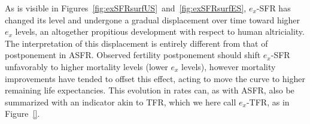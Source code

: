 As is visible in Figures~\ref{fig:exSFRsurfUS}~and~\ref{fig:exSFRsurfES}, 
$e_x$-SFR has changed its level and undergone a gradual displacement over 
time toward higher $e_x$ levels, an altogether propitious development
with respect to human altriciality. The interpretation of this displacement is
entirely different from that of postponement in ASFR. Observed fertility 
postponement should shift $e_x$-SFR unfavorably to higher mortality 
levels (lower $e_x$ levels), however mortality improvements have tended to 
offset this effect, acting to move the curve to higher
remaining life expectancies. This evolution in rates can, as with ASFR, also be
summarized with an indicator akin to TFR, which we here call $e_x$-TFR, as in
Figure~\ref{}.











